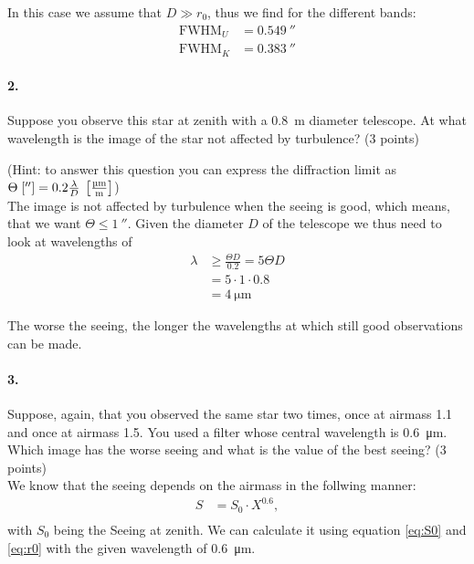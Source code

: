 \documentclass[11pt,a4paper,twoside]{article}
\begin{document}
In this case we assume that $D \gg r_0$, thus we find for the different bands:
\begin{align}
    \mathrm{FWHM}_U &= \SI{0.549}{\arcsecond}   \\
    \mathrm{FWHM}_K &= \SI{0.383}{\arcsecond}
\end{align}

\paragraph{2.} Suppose you observe this star at zenith with a \SI{0.8}{\meter}
diameter telescope. At what wavelength is the image of the star not affected by
turbulence? (3 points) 

(Hint: to answer this question you can express the diffraction limit as
$\Theta\;[\si{\arcsecond}] = 0.2\frac{\lambda}{D} \;
\left[\si[per-mode=fraction]{\micro\meter\per\meter}\right]$) \\

The image is not affected by turbulence when the seeing is good, which means,
that we want $\Theta \leq \SI{1}{\arcsecond}$. Given the diameter $D$ of the 
telescope we thus need to look at wavelengths of
\begin{align}
\lambda &\geq \frac{\Theta D}{0.2} = 5\Theta D\\
        &= 5\cdot 1 \cdot 0.8 \\
        &= \SI{4}{\micro\meter}
\end{align}

The worse the seeing, the longer the wavelengths at which still good
observations can be made.

\paragraph{3.} Suppose, again, that you observed the same star two times, once
at airmass 1.1 and once at airmass 1.5. You used a filter whose central
wavelength is \SI{0.6}{\micro\meter}.  Which image has the worse seeing and
what is the value of the best seeing?  (3 points) \\

We know that the seeing depends on the airmass in the follwing manner:
\begin{align}
S &= S_0 \cdot X^{0.6},  \\
\end{align}
with $S_0$ being the Seeing at zenith. We can calculate it using equation
\ref{eq:S0} and \ref{eq:r0} with the given wavelength of \SI{0.6}{\micro\meter}.
\end{document}
